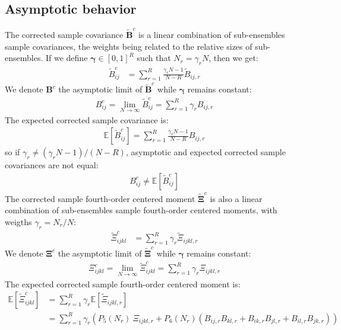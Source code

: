 \documentclass[12pt]{scrartcl}
\begin{document}
\subsection{Asymptotic behavior}
The corrected sample covariance $\widetilde{\mathbf{B}}^c$ is a linear combination of sub-ensembles sample covariances, the weights being related to the relative sizes of sub-ensembles. If we define $\boldsymbol{\gamma} \in [0,1]^R$ such that $N_r = \gamma_r N$, then we get:
\begin{align}
\widetilde{B}^c_{ij} & = \sum_{r=1}^R \frac{\gamma_r N-1}{N-R} \widetilde{B}_{ij,r}
\end{align}
We denote $\mathbf{B}^c$ the asymptotic limit of $\widetilde{\mathbf{B}}^c$ while $\boldsymbol{\gamma}$ remains constant:
\begin{align}
B^c_{ij} = \lim_{N \rightarrow \infty} \widetilde{B}^c_{ij} = \sum_{r=1}^R \gamma_r B_{ij,r}
\end{align}
The expected corrected sample covariance is:
\begin{align}
\mathbb{E} \left[\widetilde{B}^c_{ij}\right] =  \sum_{r=1}^R \frac{\gamma_r N-1}{N-R} B_{ij,r}
\end{align}
so if $\gamma_r \ne (\gamma_r N-1)/(N-R)$, asymptotic and expected corrected sample covariances are not equal:
\begin{align}
B^c_{ij} \ne \mathbb{E} \left[\widetilde{B}^c_{ij}\right]
\end{align}
$  $\\
The corrected sample fourth-order centered moment $\widetilde{\boldsymbol{\Xi}}^c$ is also a linear combination of sub-ensembles sample fourth-order centered moments, with weigths $\gamma_r = N_r/N$:
\begin{align}
\widetilde{\Xi}^c_{ijkl} & = \sum_{r=1}^R \gamma_r \widetilde{\Xi}_{ijkl,r}
\end{align}
We denote $\boldsymbol{\Xi}^c$ the asymptotic limit of $\widetilde{\boldsymbol{\Xi}}^c$ while $\boldsymbol{\gamma}$ remains constant:
\begin{align}
\Xi^c_{ijkl} = \lim_{N \rightarrow \infty} \widetilde{\Xi}^c_{ijkl} = \sum_{r=1}^R \gamma_r \Xi_{ijkl,r}
\end{align}
The expected corrected sample fourth-order centered moment is:
\begin{align}
\mathbb{E} \left[\widetilde{\Xi}^c_{ijkl}\right] & = \sum_{r=1}^R \gamma_r \mathbb{E} \left[\widetilde{\Xi}_{ijkl,r}\right] \nonumber \\
& = \sum_{r=1}^R \gamma_r \left(P_5(N_r) \ \Xi_{ijkl,r} + P_6(N_r) \left(B_{ij,r}B_{kl,r} + B_{ik,r}B_{jl,r} + B_{il,r}B_{jk,r} \right)\right)
\end{align}
\end{document}
